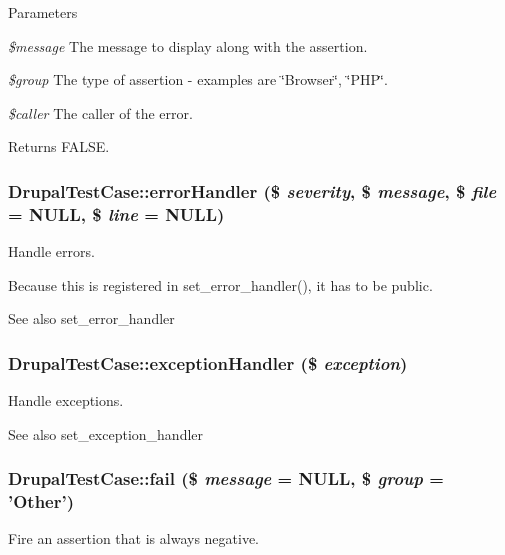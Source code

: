 \begin{DoxyParams}{Parameters}
\item[{\em \$message}]The message to display along with the assertion. \item[{\em \$group}]The type of assertion -\/ examples are \char`\"{}Browser\char`\"{}, \char`\"{}PHP\char`\"{}. \item[{\em \$caller}]The caller of the error. \end{DoxyParams}
\begin{DoxyReturn}{Returns}
FALSE. 
\end{DoxyReturn}
\hypertarget{class_drupal_test_case_aaddb077405f3177d94d44b690b1d869f}{
\subsubsection[{errorHandler}]{\setlength{\rightskip}{0pt plus 5cm}DrupalTestCase::errorHandler (\$ {\em severity}, \/  \$ {\em message}, \/  \$ {\em file} = {\ttfamily NULL}, \/  \$ {\em line} = {\ttfamily NULL})}}
\label{class_drupal_test_case_aaddb077405f3177d94d44b690b1d869f}
Handle errors.

Because this is registered in set\_\-error\_\-handler(), it has to be public. \begin{DoxySeeAlso}{See also}
set\_\-error\_\-handler 
\end{DoxySeeAlso}
\hypertarget{class_drupal_test_case_ab7cf6472833e2d3fd4de5831cfd61af9}{
\subsubsection[{exceptionHandler}]{\setlength{\rightskip}{0pt plus 5cm}DrupalTestCase::exceptionHandler (\$ {\em exception})}}
\label{class_drupal_test_case_ab7cf6472833e2d3fd4de5831cfd61af9}
Handle exceptions.

\begin{DoxySeeAlso}{See also}
set\_\-exception\_\-handler 
\end{DoxySeeAlso}
\hypertarget{class_drupal_test_case_ae90616a11b0e3df050113d79765dc226}{
\subsubsection[{fail}]{\setlength{\rightskip}{0pt plus 5cm}DrupalTestCase::fail (\$ {\em message} = {\ttfamily NULL}, \/  \$ {\em group} = {\ttfamily 'Other'})}}
\label{class_drupal_test_case_ae90616a11b0e3df050113d79765dc226}
Fire an assertion that is always negative.


